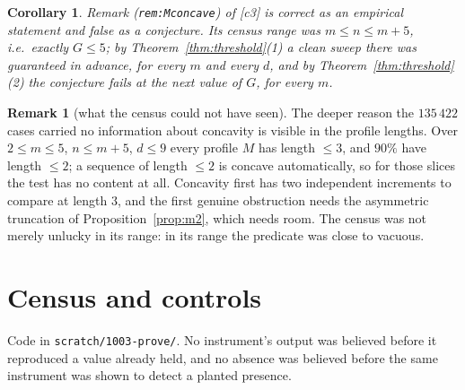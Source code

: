 \documentclass[11pt]{article}
\newtheorem{corollary}[theorem]{Corollary}
\theoremstyle{definition}
\newtheorem{remark}[theorem]{Remark}
\begin{document}
\begin{corollary}\label{cor:census}
Remark (\texttt{rem:Mconcave}) of [c3] is correct as an empirical statement and false as
a conjecture. Its census range was $m\le n\le m+5$, i.e.\ exactly $G\le5$; by
Theorem~\ref{thm:threshold}(1) a clean sweep there was guaranteed in advance, for every
$m$ and every $d$, and by Theorem~\ref{thm:threshold}(2) the conjecture fails at the next
value of $G$, for every $m$.
\end{corollary}

\begin{remark}[what the census could not have seen]
The deeper reason the $135\,422$ cases carried no information about concavity is visible
in the profile lengths. Over $2\le m\le5$, $n\le m+5$, $d\le9$ every profile $M$ has
length $\le3$, and $90\%$ have length $\le2$; a sequence of length $\le2$ is concave
automatically, so for those slices the test has no content at all. Concavity first has
two independent increments to compare at length $3$, and the first genuine obstruction
needs the asymmetric truncation of Proposition~\ref{prop:m2}, which needs room. The
census was not merely unlucky in its range: in its range the predicate was close to
vacuous.
\end{remark}

\section{Census and controls}\label{sec:verif}

Code in \verb|scratch/1003-prove/|. No instrument's output was believed before it
reproduced a value already held, and no absence was believed before the same instrument
was shown to detect a planted presence.
\end{document}
